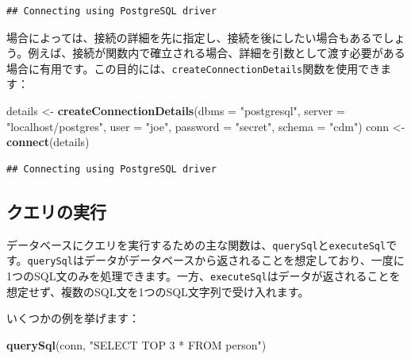 \documentclass[
  11pt]{book}
\newenvironment{Shaded}{\begin{snugshade}}{\end{snugshade}}
\newcommand{\AttributeTok}[1]{\textcolor[rgb]{0.13,0.29,0.53}{#1}}
\newcommand{\FunctionTok}[1]{\textcolor[rgb]{0.13,0.29,0.53}{\textbf{#1}}}
\newcommand{\NormalTok}[1]{#1}
\newcommand{\OtherTok}[1]{\textcolor[rgb]{0.56,0.35,0.01}{#1}}
\newcommand{\StringTok}[1]{\textcolor[rgb]{0.31,0.60,0.02}{#1}}
\theoremstyle{definition}
\theoremstyle{definition}
\theoremstyle{definition}
\theoremstyle{definition}
\theoremstyle{remark}
\begin{document}
\begin{verbatim}
## Connecting using PostgreSQL driver
\end{verbatim}

場合によっては、接続の詳細を先に指定し、接続を後にしたい場合もあるでしょう。例えば、接続が関数内で確立される場合、詳細を引数として渡す必要がある場合に有用です。この目的には、\texttt{createConnectionDetails}関数を使用できます：

\begin{Shaded}
\begin{Highlighting}[]
\NormalTok{details }\OtherTok{\textless{}{-}} \FunctionTok{createConnectionDetails}\NormalTok{(}\AttributeTok{dbms =} \StringTok{"postgresql"}\NormalTok{,}
                                   \AttributeTok{server =} \StringTok{"localhost/postgres"}\NormalTok{,}
                                   \AttributeTok{user =} \StringTok{"joe"}\NormalTok{,}
                                   \AttributeTok{password =} \StringTok{"secret"}\NormalTok{,}
                                   \AttributeTok{schema =} \StringTok{"cdm"}\NormalTok{)}
\NormalTok{conn }\OtherTok{\textless{}{-}} \FunctionTok{connect}\NormalTok{(details)}
\end{Highlighting}
\end{Shaded}

\begin{verbatim}
## Connecting using PostgreSQL driver
\end{verbatim}

\subsection{クエリの実行}\label{ux30afux30a8ux30eaux306eux5b9fux884c}

データベースにクエリを実行するための主な関数は、\texttt{querySql}と\texttt{executeSql}です。\texttt{querySql}はデータがデータベースから返されることを想定しており、一度に1つのSQL文のみを処理できます。一方、\texttt{executeSql}はデータが返されることを想定せず、複数のSQL文を1つのSQL文字列で受け入れます。 

いくつかの例を挙げます：

\begin{Shaded}
\begin{Highlighting}[]
\FunctionTok{querySql}\NormalTok{(conn, }\StringTok{"SELECT TOP 3 * FROM person"}\NormalTok{)}
\end{Highlighting}
\end{Shaded}
\end{document}
